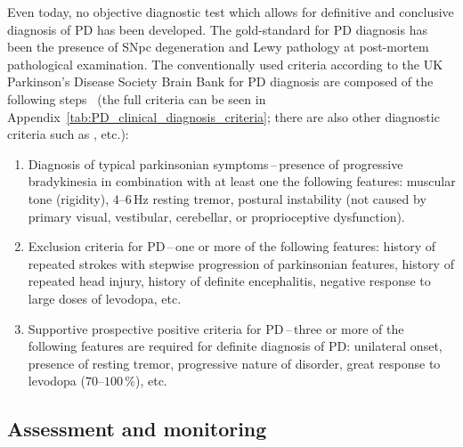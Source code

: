 Even today, no objective diagnostic test which allows for definitive and conclusive diagnosis of PD has been developed. The gold-standard for PD diagnosis has been the presence of SNpc degeneration and Lewy pathology at post-mortem pathological examination. The conventionally used criteria according to the UK Parkinson's Disease Society Brain Bank for PD diagnosis are composed of the following steps~\cite{Hughes1992} (the full criteria can be seen in Appendix~\ref{tab:PD_clinical_diagnosis_criteria}; there are also other diagnostic criteria such as \cite{Gelb1999, Albanese2003, Postuma2015}, etc.): 
\begin{enumerate}
	\item Diagnosis of typical parkinsonian symptoms\,--\,presence of progressive bradykinesia in combination with at least one the following features: muscular tone (rigidity), $4$--$6$\,Hz resting tremor, postural instability (not caused by primary visual, vestibular, cerebellar, or proprioceptive dysfunction).
	\item Exclusion criteria for PD\,--\,one or more of the following features: history of repeated strokes with stepwise progression of parkinsonian features, history of repeated head injury, history of definite encephalitis, negative response to large doses of levodopa, etc.
	\item Supportive prospective positive criteria for PD\,--\,three or more of the following features are required for definite diagnosis of PD: unilateral onset, presence of resting tremor, progressive nature of disorder, great response to levodopa ($70$--$100$\,\%), etc.
\end{enumerate}

\subsection{Assessment and monitoring}
\label{ch1_2.2}

